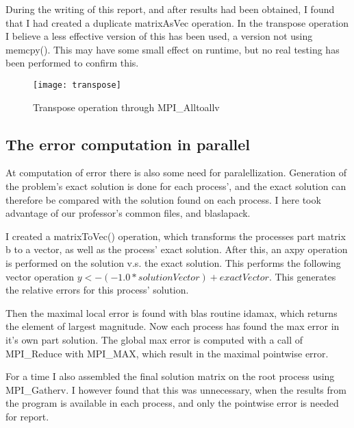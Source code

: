 During the writing of this report, and after results had been obtained, I found that I had created a duplicate matrixAsVec operation. In the transpose operation I believe a less effective version of this has been used, a version not using memcpy(). This may have some small effect on runtime, but no real testing has been performed to confirm this.

\begin{figure}[htbp]
	\centering
	\texttt{[image: transpose]}
	\caption{Transpose operation through MPI\_Alltoallv}
	\label{fig:transpose}
\end{figure}

\subsection{The error computation in parallel}
At computation of error there is also some need for paralellization. Generation of the problem's exact solution is done for each process', and the exact solution can therefore be compared with the solution found on each process. I here took advantage of our professor's common files, and blaslapack. 

I created a matrixToVec() operation, which transforms the processes part matrix b to a vector, as well as the process' exact solution. After this, an axpy operation is performed on the solution v.s. the exact solution. This performs the following vector operation $y <- (-1.0*solutionVector) + exactVector$. This generates the relative errors for this process' solution. 

Then the maximal local error is found with blas routine idamax, which returns the element of largest magnitude. Now each process has found the max error in it's own part solution. The global max error is computed with a call of MPI\_Reduce with MPI\_MAX, which result in the maximal pointwise error.

For a time I also assembled the final solution matrix on the root process using MPI\_Gatherv. I however found that this was unnecessary, when the results from the program is available in each process, and only the pointwise error is needed for report. 

